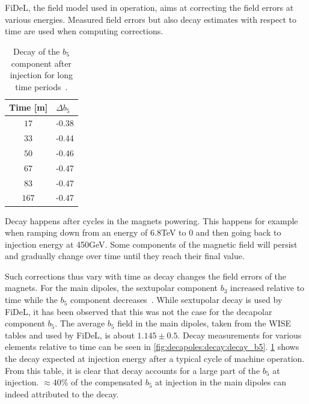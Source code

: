 \section{}
\label{section:decapoles:decay}

FiDeL, the field model used in operation, aims at correcting the field errors at various energies.
Measured field errors but also decay estimates with respect to time are used when computing
corrections.

\begin{table}
    \centering
    \begin{tabular}{cl}
        \toprule
        Time [m] & $\Delta b_5$ \\
        \midrule
        $17$    & -0.38 \\ 
        $33$    & -0.44 \\
        $50$    & -0.46 \\
        $67$    & -0.47 \\
        $83$    & -0.47 \\
        $167$   & -0.47 \\
        \bottomrule
    \end{tabular}
    \caption{Decay of the $b_5$ component after injection for long time
    periods~\cite{deniau_magnetic_2009}.}
    \label{table:decapoles:decay:decay_b5}
\end{table}
 
Decay happens after cycles in the magnets powering. This happens for example when
ramping down from an energy of 6.8TeV to 0 and then going back to injection energy at 450GeV. Some
components of the magnetic field will persist and gradually change over time until they reach their
final value.

Such corrections thus vary with time as decay changes the field errors of the magnets.
For the main dipoles, the sextupolar component $b_3$ increased relative to time while the $b_5$
component decreases~\cite{deniau_magnetic_2009}.
While sextupolar decay is used by FiDeL, it has been observed that this was not the case for the
decapolar component $b_5$. The average $b_5$ field in the main dipoles, taken from the WISE tables
and used by FiDeL, is about $1.145 \pm 0.5$. Decay measurements for various elements relative to
time can be seen in \cref{fig:decapoles:decay:decay_b5}.
\cref{table:decapoles:decay:decay_b5} shows the decay expected at injection energy after a typical
cycle of machine operation. From this table, it is clear that decay accounts for a large part of the
$b_5$ at injection. $\approx 40\%$ of the compensated $b_5$ at injection in the main dipoles can
indeed attributed to the decay.

